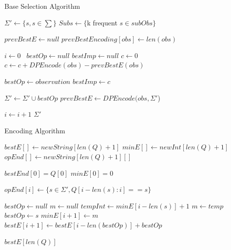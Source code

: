 \begin{algorithm}
\caption{Base Selection Algorithm}
\label{Base Selection}
\begin{algorithmic}[1]
\State $\Sigma' \gets \{s, s \in \sum \}$
\State $Subs \gets \{$k frequent $s \in subObs\}$

\State $prevBestE \gets null$
	\State $prevBestEncoding[obs] \gets len(obs)$
\EndFor

\State $i\gets 0$\
	\State $bestOp \gets null$
	\State $bestImp \gets null$
		\State $c \gets 0$
			\State $c \gets c+DPEncode(obs)-prevBestE(obs)$
		\EndFor
		
			\State $bestOp \gets observation$
			\State $bestImp \gets c$
		\EndIf
		
	\EndFor

	\State $\Sigma' \gets \Sigma' \cup bestOp$
		\State $prevBestE \gets DPEncode(obs,\Sigma'$) 
	\EndFor	
	
	\State $i \gets i + 1$
\EndWhile 
\State \Return $\Sigma'$

\EndProcedure
\end{algorithmic}
\end{algorithm}

\begin{algorithm}
\caption{Encoding Algorithm}
\label{Encoding Algorithm}
\begin{algorithmic}[1]

\State $bestE[] \gets new String[len(Q)+1]$
\State $minE[] \gets new Int[len(Q)+1]$
\State $opEnd[] \gets new String[len(Q)+1][]$

\State $bestEnd[0] = Q[0]$
\State $minE[0] = 0$

	 \State $opEnd[i] \gets \{s \in \Sigma', Q[i-len(s):i] == s\}$
\EndFor

	\State $bestOp \gets null$
	\State $m \gets null$ 
		\State $tempInt \gets minE[i-len(s)] + 1$
			\State $m \gets temp$ 
			\State $bestOp \gets s$
		\EndIf
	\EndFor
	\State $minE[i+1] \gets m$
	\State $bestE[i+1] \gets bestE[i-len(bestOp)] + bestOp$
\EndFor

\State \Return $bestE[len(Q)]$

\EndProcedure
\end{algorithmic}
\end{algorithm}





